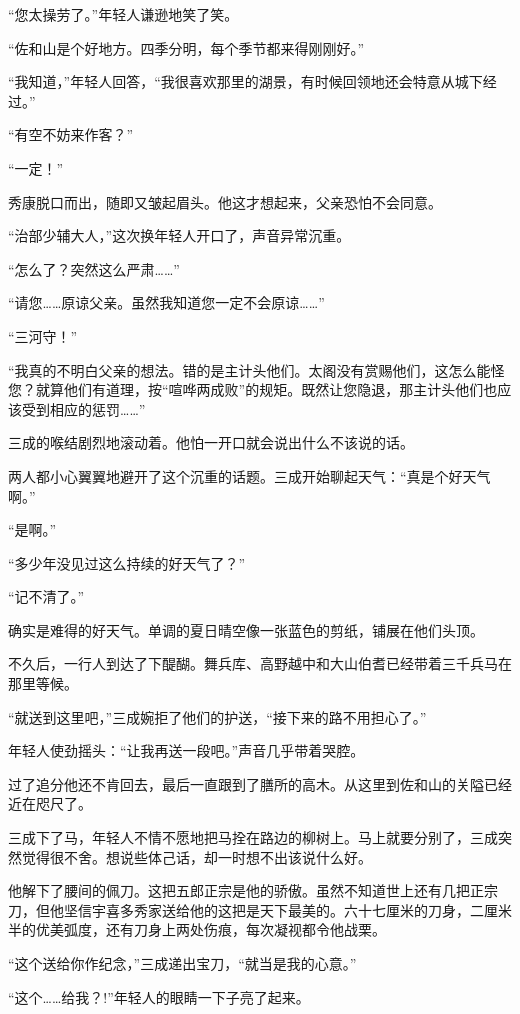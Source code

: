 \documentclass[
]{book}
\begin{document}
``您太操劳了。''年轻人谦逊地笑了笑。

``佐和山是个好地方。四季分明，每个季节都来得刚刚好。''

``我知道，''年轻人回答，``我很喜欢那里的湖景，有时候回领地还会特意从城下经过。''

``有空不妨来作客？''

``一定！''

秀康脱口而出，随即又皱起眉头。他这才想起来，父亲恐怕不会同意。

``治部少辅大人，''这次换年轻人开口了，声音异常沉重。

``怎么了？突然这么严肃\ldots\ldots{}''

``请您\ldots\ldots 原谅父亲。虽然我知道您一定不会原谅\ldots\ldots{}''

``三河守！''

``我真的不明白父亲的想法。错的是主计头他们。太阁没有赏赐他们，这怎么能怪您？就算他们有道理，按``喧哗两成败''的规矩。既然让您隐退，那主计头他们也应该受到相应的惩罚\ldots\ldots''

三成的喉结剧烈地滚动着。他怕一开口就会说出什么不该说的话。

两人都小心翼翼地避开了这个沉重的话题。三成开始聊起天气：``真是个好天气啊。''

``是啊。''

``多少年没见过这么持续的好天气了？''

``记不清了。''

确实是难得的好天气。单调的夏日晴空像一张蓝色的剪纸，铺展在他们头顶。

不久后，一行人到达了下醍醐。舞兵库、高野越中和大山伯耆已经带着三千兵马在那里等候。

``就送到这里吧，''三成婉拒了他们的护送，``接下来的路不用担心了。''

年轻人使劲摇头：``让我再送一段吧。''声音几乎带着哭腔。

过了追分他还不肯回去，最后一直跟到了膳所的高木。从这里到佐和山的关隘已经近在咫尺了。

三成下了马，年轻人不情不愿地把马拴在路边的柳树上。马上就要分别了，三成突然觉得很不舍。想说些体己话，却一时想不出该说什么好。

他解下了腰间的佩刀。这把五郎正宗是他的骄傲。虽然不知道世上还有几把正宗刀，但他坚信宇喜多秀家送给他的这把是天下最美的。六十七厘米的刀身，二厘米半的优美弧度，还有刀身上两处伤痕，每次凝视都令他战栗。

``这个送给你作纪念，''三成递出宝刀，``就当是我的心意。''

``这个\ldots\ldots 给我？!''年轻人的眼睛一下子亮了起来。
\end{document}
